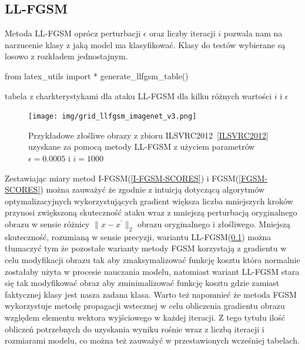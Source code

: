 \documentclass[
    left=2.5cm,         %
    right=2.5cm,        %
    top=2.5cm,          %
    bottom=3cm,         %
    bindingoffset=6mm,  %
    nohyphenation=false %
]{eiti/eiti-thesis}
\begin{document}
\subsection{LL-FGSM}\label{LL-FGSM-SCORES}
Metoda LL-FGSM oprócz perturbacji \(\epsilon\) oraz liczby iteracji \(i\) pozwala nam na narzucenie klasy z jaką model
ma klasyfikować. Klasy do testów wybierane są losowo z rozkładem jednostajnym.
\begin{table}[h!]
\begin{adjustbox}{max width=\textwidth}
\begin{pycode}
from latex_utils import *
generate_llfgsm_table()
\end{pycode}
\end{adjustbox}
\caption{tabela z charkterystykami dla ataku LL-FGSM dla kilku różnych wartości \(i\) i \(\epsilon\)}
\end{table}

\pagebreak

\begin{figure}[H]
        \texttt{[image: img/grid\_llfgsm\_imagenet\_v3.png]}
        \caption{Przykładowe złośliwe obrazy z zbioru ILSVRC2012~\ref{ILSVRC2012} uzyskane za pomocą metody LL-FGSM z użyciem parametrów \(\epsilon=0.0005\) i \(i=1000\)}
        \label{fig:imagenet_grid_llfgsm}
\end{figure}

Zestawiając miary metod I-FGSM(\ref{I-FGSM-SCORES}) i FGSM(\ref{FGSM-SCORES}) można zauważyć że zgodnie z intuicją dotyczącą
algorytmów optymalizacyjnych wykorzystujących gradient większa liczba mniejszych kroków przynosi zwiększoną skuteczność ataku wraz
z mniejszą perturbacją oryginalnego obrazu w sensie różnicy \(\|x-x^{'}\|_2\) obrazu oryginalnego i złośliwego.
Mniejszą skuteczność, rozumianą w sensie precyzji, wariantu LL-FGSM(\ref{LL-FGSM-SCORES}) można tłumaczyć tym że pozostałe warianty
metody FGSM korzystają z gradientu w celu modyfikacji obrazu tak aby zmaksymalizować funkcję kosztu która normalnie zostałaby użyta w procesie nauczania modelu,
natomiast wariant LL-FGSM stara się tak modyfikować obraz aby zminimalizować funkcję kosztu gdzie zamiast faktycznej klasy jest nasza zadana klasa.
Warto też napomnieć że metoda FGSM wykorzystuje metodę propagacji wstecznej w celu obliczenia gradientu obrazu względem elementu wektora wyjściowego w każdej iteracji.
Z tego tytułu ilość obliczeń potrzebnych do uzyskania wyniku rośnie wraz z liczbą iteracji i rozmiarami modelu, co można też zauważyć w przestawionych wcześniej
tabelach.
\end{document}
